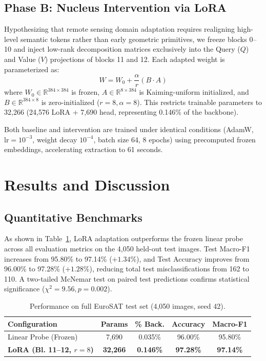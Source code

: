 \documentclass[conference,a4paper]{IEEEtran}
\begin{document}
\subsection{Phase B: Nucleus Intervention via LoRA}
Hypothesizing that remote sensing domain adaptation requires realigning high-level semantic tokens rather than early geometric primitives, we freeze blocks 0--10 and inject low-rank decomposition matrices exclusively into the Query ($Q$) and Value ($V$) projections of blocks 11 and 12. Each adapted weight is parameterized as:
\begin{equation}
W = W_0 + \frac{\alpha}{r}(B \cdot A)
\end{equation}
where $W_0 \in \mathbb{R}^{384 \times 384}$ is frozen, $A \in \mathbb{R}^{8 \times 384}$ is Kaiming-uniform initialized, and $B \in \mathbb{R}^{384 \times 8}$ is zero-initialized ($r=8, \alpha=8$). This restricts trainable parameters to 32,266 (24,576 LoRA + 7,690 head, representing 0.146\% of the backbone). 

Both baseline and intervention are trained under identical conditions (AdamW, $\text{lr}=10^{-3}$, weight decay $10^{-4}$, batch size 64, 8 epochs) using precomputed frozen embeddings, accelerating extraction to 61 seconds.

\section{Results and Discussion}
\subsection{Quantitative Benchmarks}
As shown in Table~\ref{tab:results}, LoRA adaptation outperforms the frozen linear probe across all evaluation metrics on the 4,050 held-out test images. Test Macro-F1 increases from 95.80\% to 97.14\% ($+1.34\%$), and Test Accuracy improves from 96.00\% to 97.28\% ($+1.28\%$), reducing total test misclassifications from 162 to 110. A two-tailed McNemar test on paired test predictions confirms statistical significance ($\chi^2 = 9.56, p = 0.002$).

\begin{table}[t]
\centering
\caption{Performance on full EuroSAT test set (4,050 images, seed 42).}
\label{tab:results}
\begin{tabular}{lcccc}
\toprule
\textbf{Configuration} & \textbf{Params} & \textbf{\% Back.} & \textbf{Accuracy} & \textbf{Macro-F1} \\
\midrule
Linear Probe (Frozen) & 7,690 & 0.035\% & 96.00\% & 95.80\% \\
\textbf{LoRA (Bl. 11--12, $r=8$)} & \textbf{32,266} & \textbf{0.146\%} & \textbf{97.28\%} & \textbf{97.14\%} \\
\bottomrule
\end{tabular}
\end{table}
\end{document}
